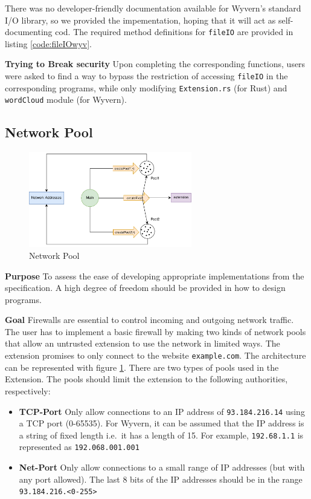 There was no developer-friendly documentation available for Wyvern's standard I/O library, so we provided the impementation, hoping that it will act as self-documenting cod. The required method definitions for \texttt{fileIO} are provided in listing \ref{code:fileIOwyv}.

\noindent
\textbf{Trying to Break security} Upon completing the corresponding functions, users were asked to find a way to bypass the restriction of accessing \texttt{fileIO} in the corresponding programs, while only modifying \texttt{Extension.rs} (for Rust) and \texttt{wordCloud} module (for Wyvern).

\subsection{Network Pool}\label{sec:networkPool}

\begin{figure}[htbp]
\centering
\includegraphics[width=2.8in]{figures/network.jpg}
\caption{Network Pool}
\label{fig:network}
\end{figure}

\noindent
\textbf{Purpose} To assess the ease of developing appropriate implementations from the specification. A high degree of freedom should be provided in how to design programs.

\noindent
\textbf{Goal} Firewalls are essential to control incoming and outgoing network traffic. The user has to implement a basic firewall by making two kinds of network pools that allow an untrusted extension to use the network in limited ways. The extension promises to only connect to the website \texttt{example.com}. The architecture can be represented with figure \ref{fig:network}. There are two types of pools used in the Extension. The pools should limit the extension to the following authorities, respectively:

\begin{itemize}
    \item \textbf{TCP-Port} Only allow connections to an IP address of \texttt{93.184.216.14} using a TCP port (0-65535). For Wyvern, it can be assumed that the IP address is a string of fixed length i.e.\ it has a length of 15. For example, \texttt{192.68.1.1} is represented as \texttt{192.068.001.001}
    \item \textbf{Net-Port} Only allow connections to a small range of IP addresses (but with any port allowed). The last 8 bits of the IP addresses should be in the range \texttt{93.184.216.<0-255>}
\end{itemize}

